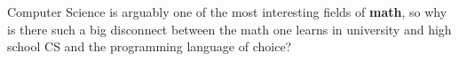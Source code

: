 \documentclass[../main.tex]{subfiles}
\begin{document}
Computer Science is arguably one of the most interesting fields of \textbf{math}, so why is there such a big disconnect between the math one learns in university and high school CS and the programming language of choice?
\end{document}
